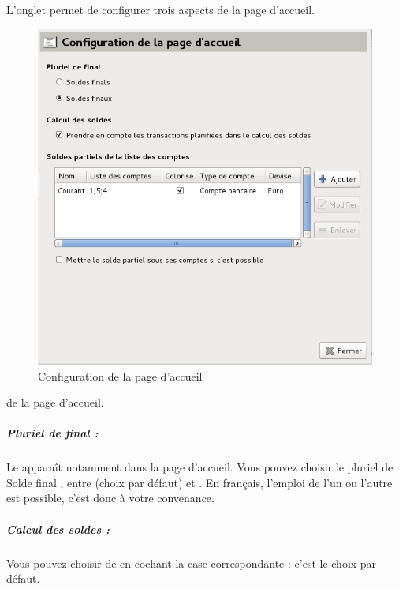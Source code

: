 L'onglet  permet de configurer trois aspects \ifIllustration de la page d'accueil.
\begin{figure}[ht]
\begin{center}
\includegraphics[scale=0.5]{image/screenshot/setup_home}
\end{center}
\caption{Configuration de la page d'accueil}
\label{setup-home-img}
\end{figure}
\else de la page d'accueil.
\fi


\subparagraph{Pluriel de final :\label{setup-general-home-final}}

Le  apparaît notamment dans la page d'accueil. Vous pouvez choisir le pluriel de \og Solde final \fg{}, entre  (choix par défaut) et . En français, l'emploi de l'un ou l'autre est possible, c'est donc à votre convenance. 



\subparagraph{Calcul des soldes :\label{setup-general-home-balance}}

Vous pouvez choisir de  en cochant la case correspondante : c'est le choix par défaut.


